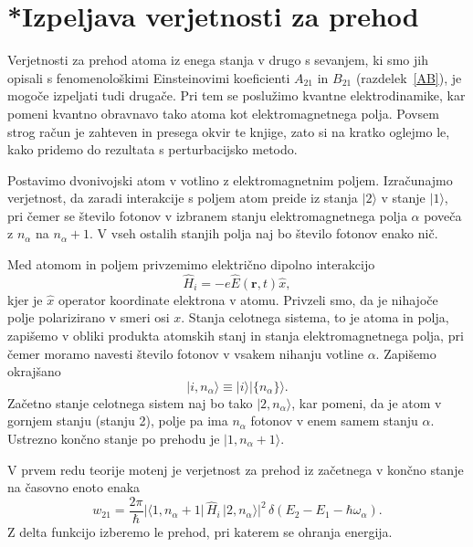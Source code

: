 \section{*Izpeljava verjetnosti za prehod}
\label{chap:verjetnost}
Verjetnosti za prehod atoma iz enega stanja v drugo s sevanjem, ki
smo jih opisali s fenomenološkimi Einsteinovimi koeficienti $A_{21}$
in $B_{21}$ (razdelek~\ref{AB}), 
je mogoče izpeljati tudi drugače.
Pri tem se poslužimo kvantne elektrodinamike, 
kar pomeni kvantno obravnavo 
tako atoma kot elektromagnetnega polja. Povsem strog račun je zahteven in presega
okvir te knjige, zato si na kratko oglejmo le, kako pridemo do rezultata s
perturbacijsko metodo.

Postavimo dvonivojski atom v votlino z elektromagnetnim poljem.
Izračunajmo verjetnost, da zaradi interakcije s poljem atom
preide iz stanja $|2\rangle$ v stanje $|1\rangle$, pri čemer se
število fotonov v izbranem stanju elektromagnetnega polja $\alpha$
poveča z $n_{\alpha}$ na $n_{\alpha}+1$. V vseh ostalih stanjih
polja naj bo število fotonov enako nič.

Med atomom in poljem privzemimo električno dipolno interakcijo 
\begin{equation}
\hat{H}_{i}=-e\hat{E}(\mathbf{r},t)\hat{x},
\label{4.47}
\end{equation}
kjer je $\hat{x}$ operator koordinate elektrona v atomu. 
Privzeli
smo, da je nihajoče polje polarizirano v smeri osi $x$. Stanja celotnega sistema, 
to je atoma in polja, zapišemo v obliki produkta atomskih stanj in
stanja elektromagnetnega polja, pri čemer moramo navesti število fotonov
v vsakem nihanju votline $\alpha$. Zapišemo okrajšano
\begin{equation}
|i,n_{\alpha}\rangle\equiv|i\rangle|\{n_{\alpha}\}\rangle.
\label{4.48}
\end{equation}
Začetno stanje celotnega sistem naj bo tako $|2,n_{\alpha}\rangle$, kar pomeni, da je
atom v gornjem stanju (stanju 2), polje pa ima $n_{\alpha}$ fotonov v enem samem stanju $\alpha$.
Ustrezno končno stanje po prehodu je $|1,n_{\alpha}+1\rangle$.

V prvem redu teorije motenj je verjetnost za prehod iz začetnega v končno stanje
na časovno enoto enaka
\begin{equation}
w_{21}=\frac{2\pi}{\hbar}|\langle1,n_{\alpha}+
1|\,\hat{H}_{i}\,|2,n_{\alpha}\rangle|^{2}\,
\delta(E_{2}-E_{1}-\hbar\omega_{\alpha}).
\label{4.49}
\end{equation}
Z delta funkcijo izberemo le prehod, pri katerem se ohranja
energija.

